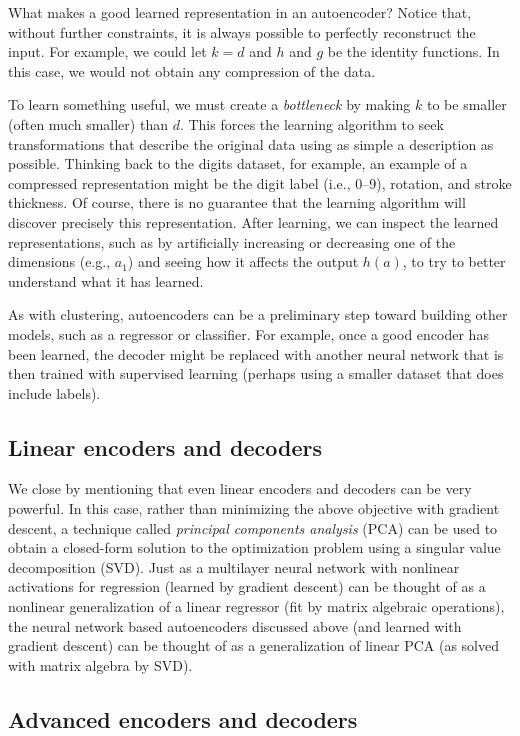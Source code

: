 What makes a good learned representation in an autoencoder? Notice
that, without further constraints, it is always possible to perfectly
reconstruct the input. For example, we could let $k=d$ and $h$ and $g$
be the identity functions. In this case, we would not obtain any
compression of the data.

To learn something useful, we must create a
\textit{bottleneck} by making $k$ to be smaller (often much smaller)
than $d$. This forces the learning algorithm to seek transformations
that describe the original data using as simple a description as
possible. Thinking back to the digits dataset, for example, an example
of a compressed representation might be the digit label (i.e., 0--9),
rotation, and stroke thickness. Of course, there is no guarantee that
the learning algorithm will discover precisely this
representation. After learning, we can inspect the learned
representations, such as by artificially increasing or decreasing one
of the dimensions (e.g., $a_1$) and seeing how it affects the output
$h(a)$, to try to better understand what it has learned.

As with clustering, autoencoders can be a preliminary step toward
building other models, such as a regressor or classifier. For example,
once a good encoder has been learned, the decoder might be replaced
with another neural network that is then trained with supervised learning
(perhaps using a smaller dataset that does include labels).

\subsection{Linear encoders and decoders}

We close by mentioning that even linear encoders and decoders can be
very powerful. In this case, rather than minimizing the above
objective with gradient descent, a technique called \textit{principal
  components analysis} (PCA) can be used to obtain a closed-form
solution to the optimization problem using a singular value
decomposition (SVD).  Just as a multilayer neural network with
nonlinear activations for regression (learned by gradient descent) can
be thought of as a nonlinear generalization of a linear regressor (fit
by matrix algebraic operations), the neural network based autoencoders
discussed above (and learned with gradient descent) can be thought of
as a generalization of linear PCA (as solved with matrix algebra by
SVD).

\subsection{Advanced encoders and decoders}

